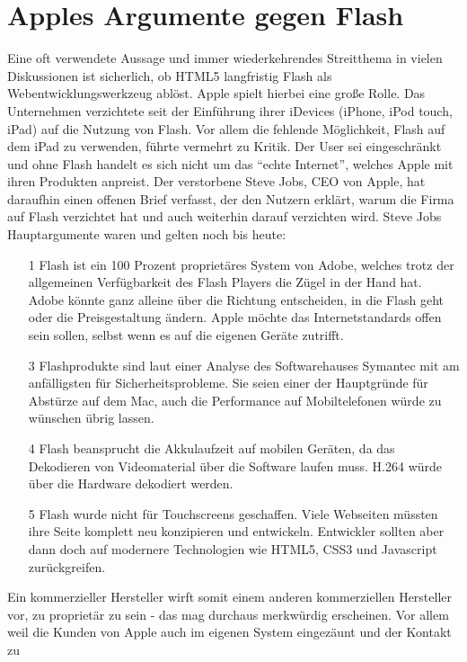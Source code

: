 \section{Apples Argumente gegen Flash}
Eine oft verwendete Aussage und immer wiederkehrendes Streitthema in vielen
Diskussionen ist sicherlich, ob HTML5 langfristig Flash als
Webentwicklungswerkzeug ablöst. Apple spielt hierbei eine große Rolle. Das
Unternehmen verzichtete seit der Einführung ihrer iDevices (iPhone, iPod
touch, iPad) auf die Nutzung von Flash. Vor allem die fehlende Möglichkeit,
Flash auf dem iPad zu verwenden, führte vermehrt zu Kritik. Der User sei
eingeschränkt und ohne Flash handelt es sich nicht um das "`echte Internet"',
welches Apple mit ihren Produkten anpreist. Der verstorbene Steve Jobs, CEO
von Apple, hat daraufhin einen offenen Brief verfasst, der den Nutzern
erklärt, warum die Firma auf Flash verzichtet hat und auch weiterhin darauf
verzichten wird. Steve Jobs Hauptargumente waren und gelten noch bis heute:
\begin{itemize}
	\item[1]{
		Flash ist ein 100 Prozent proprietäres System von Adobe, welches trotz der
		allgemeinen Verfügbarkeit des Flash Players die Zügel in der Hand hat.
		Adobe könnte ganz alleine über die Richtung entscheiden, in die Flash
		geht oder die Preisgestaltung ändern. Apple möchte das Internetstandards
		offen sein sollen, selbst wenn es auf die eigenen Geräte zutrifft.
	}
	\item[3]{
		Flashprodukte sind laut einer Analyse des Softwarehauses Symantec mit
		am anfälligsten für Sicherheitsprobleme. Sie seien einer der Hauptgründe
		für Abstürze auf dem Mac, auch die Performance auf Mobiltelefonen würde
		zu wünschen übrig lassen.
	}
	\item[4]{
		Flash beansprucht die Akkulaufzeit auf mobilen Geräten, da das Dekodieren
		von Videomaterial über die Software laufen muss. H.264 würde über die
		Hardware dekodiert werden.
	}
	\item[5]{
		Flash wurde nicht für Touchscreens geschaffen. Viele Webseiten müssten
		ihre Seite komplett neu konzipieren und entwickeln. Entwickler sollten
		aber dann doch auf modernere Technologien wie HTML5, CSS3 und
		Javascript zurückgreifen.
	}
\end{itemize}
Ein kommerzieller Hersteller wirft somit einem anderen kommerziellen Hersteller
vor, zu proprietär zu sein - das mag durchaus merkwürdig erscheinen. Vor allem
weil die Kunden von Apple auch im eigenen System eingezäunt und der Kontakt zu
